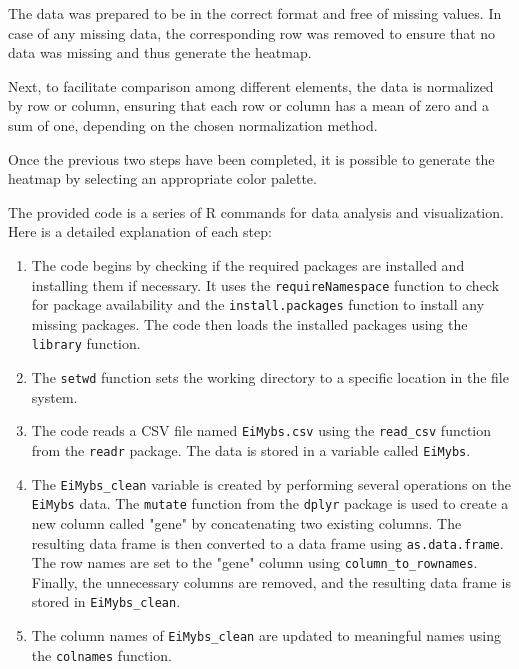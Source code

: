 \documentclass{article}
\begin{document}
The data was prepared to be in the correct format and free of missing values. In case of any missing data, the corresponding row was removed to ensure that no data was missing and thus generate the heatmap.

Next, to facilitate comparison among different elements, the data is normalized by row or column, ensuring that each row or column has a mean of zero and a sum of one, depending on the chosen normalization method.

Once the previous two steps have been completed, it is possible to generate the heatmap by selecting an appropriate color palette.

The provided code is a series of R commands for data analysis and visualization. Here is a detailed explanation of each step:

\begin{enumerate}
\item The code begins by checking if the required packages are installed and installing them if necessary. It uses the \texttt{requireNamespace} function to check for package availability and the \texttt{install.packages} function to install any missing packages. The code then loads the installed packages using the \texttt{library} function.


\item The \texttt{setwd} function sets the working directory to a specific location in the file system.

\item The code reads a CSV file named \texttt{EiMybs.csv} using the \texttt{read\_csv} function from the \texttt{readr} package. The data is stored in a variable called \texttt{EiMybs}.

\item The \texttt{EiMybs\_clean} variable is created by performing several operations on the \texttt{EiMybs} data. The \texttt{mutate} function from the \texttt{dplyr} package is used to create a new column called "gene" by concatenating two existing columns. The resulting data frame is then converted to a data frame using \texttt{as.data.frame}. The row names are set to the "gene" column using \texttt{column\_to\_rownames}. Finally, the unnecessary columns are removed, and the resulting data frame is stored in \texttt{EiMybs\_clean}.

\item The column names of \texttt{EiMybs\_clean} are updated to meaningful names using the \texttt{colnames} function.


\end{enumerate}
\end{document}
